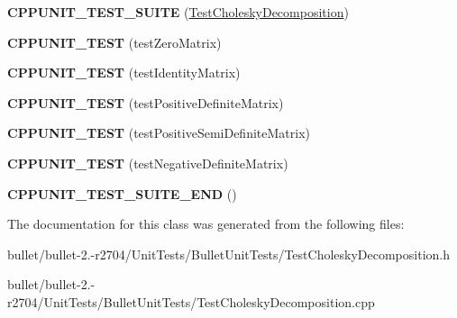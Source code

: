 \begin{DoxyCompactItemize}
\item 
\hypertarget{class_test_cholesky_decomposition_a9a0ca66a17634fbc2c4e2895a1ff3bd1}{{\bfseries C\+P\+P\+U\+N\+I\+T\+\_\+\+T\+E\+S\+T\+\_\+\+S\+U\+I\+T\+E} (\hyperlink{class_test_cholesky_decomposition}{Test\+Cholesky\+Decomposition})}\label{class_test_cholesky_decomposition_a9a0ca66a17634fbc2c4e2895a1ff3bd1}

\item 
\hypertarget{class_test_cholesky_decomposition_a9a62fc02b6a72cae82c72909a542c2f8}{{\bfseries C\+P\+P\+U\+N\+I\+T\+\_\+\+T\+E\+S\+T} (test\+Zero\+Matrix)}\label{class_test_cholesky_decomposition_a9a62fc02b6a72cae82c72909a542c2f8}

\item 
\hypertarget{class_test_cholesky_decomposition_a02722bad6afb17c4359cd12af2302056}{{\bfseries C\+P\+P\+U\+N\+I\+T\+\_\+\+T\+E\+S\+T} (test\+Identity\+Matrix)}\label{class_test_cholesky_decomposition_a02722bad6afb17c4359cd12af2302056}

\item 
\hypertarget{class_test_cholesky_decomposition_aa3c4ca62104ed04d2b4f5e0fc2284b53}{{\bfseries C\+P\+P\+U\+N\+I\+T\+\_\+\+T\+E\+S\+T} (test\+Positive\+Definite\+Matrix)}\label{class_test_cholesky_decomposition_aa3c4ca62104ed04d2b4f5e0fc2284b53}

\item 
\hypertarget{class_test_cholesky_decomposition_a545506e1d389082fea10c1a2684a40b9}{{\bfseries C\+P\+P\+U\+N\+I\+T\+\_\+\+T\+E\+S\+T} (test\+Positive\+Semi\+Definite\+Matrix)}\label{class_test_cholesky_decomposition_a545506e1d389082fea10c1a2684a40b9}

\item 
\hypertarget{class_test_cholesky_decomposition_a1ac3ba455b9959f5d0cfff177cf93078}{{\bfseries C\+P\+P\+U\+N\+I\+T\+\_\+\+T\+E\+S\+T} (test\+Negative\+Definite\+Matrix)}\label{class_test_cholesky_decomposition_a1ac3ba455b9959f5d0cfff177cf93078}

\item 
\hypertarget{class_test_cholesky_decomposition_aa6b49b54ee8f7ef65f57d2903c9c310c}{{\bfseries C\+P\+P\+U\+N\+I\+T\+\_\+\+T\+E\+S\+T\+\_\+\+S\+U\+I\+T\+E\+\_\+\+E\+N\+D} ()}\label{class_test_cholesky_decomposition_aa6b49b54ee8f7ef65f57d2903c9c310c}

\end{DoxyCompactItemize}


The documentation for this class was generated from the following files\+:\begin{DoxyCompactItemize}
\item 
bullet/bullet-\/2.-\/r2704/\+Unit\+Tests/\+Bullet\+Unit\+Tests/Test\+Cholesky\+Decomposition.\+h\item 
bullet/bullet-\/2.-\/r2704/\+Unit\+Tests/\+Bullet\+Unit\+Tests/Test\+Cholesky\+Decomposition.\+cpp\end{DoxyCompactItemize}
